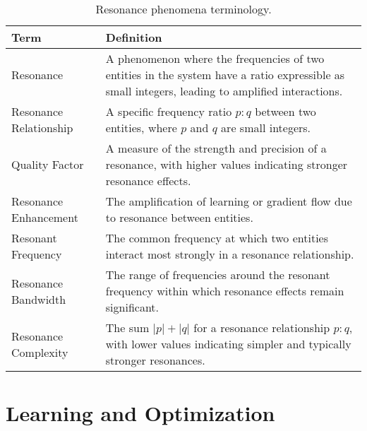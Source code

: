 \begin{table}[h]
\centering
\begin{tabular}{|l|p{12cm}|}
\hline
\textbf{Term} & \textbf{Definition} \\
\hline
Resonance & A phenomenon where the frequencies of two entities in the system have a ratio expressible as small integers, leading to amplified interactions. \\
\hline
Resonance Relationship & A specific frequency ratio $p:q$ between two entities, where $p$ and $q$ are small integers. \\
\hline
Quality Factor & A measure of the strength and precision of a resonance, with higher values indicating stronger resonance effects. \\
\hline
Resonance Enhancement & The amplification of learning or gradient flow due to resonance between entities. \\
\hline
Resonant Frequency & The common frequency at which two entities interact most strongly in a resonance relationship. \\
\hline
Resonance Bandwidth & The range of frequencies around the resonant frequency within which resonance effects remain significant. \\
\hline
Resonance Complexity & The sum $|p|+|q|$ for a resonance relationship $p:q$, with lower values indicating simpler and typically stronger resonances. \\
\hline
\end{tabular}
\caption{Resonance phenomena terminology.}
\label{tab:resonance_terminology}
\end{table}

\section{Learning and Optimization}

